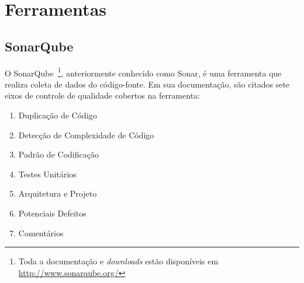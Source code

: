 \chapter{Ferramentas}

\section{SonarQube}
O SonarQube~\footnote{Toda a documentação e \textit{downloads} estão disponíveis
em \url{http://www.sonarqube.org/}}, anteriormente conhecido como Sonar, é uma 
ferramenta que realiza coleta de dados do código-fonte. Em sua documentação, 
são citados sete eixos de controle de qualidade cobertos na ferramenta: 

\begin{enumerate}
\item Duplicação de Código
\item Detecção de Complexidade de Código
\item Padrão de Codificação
\item Testes Unitários
\item Arquitetura e Projeto
\item Potenciais Defeitos
\item Comentários
\end{enumerate}

